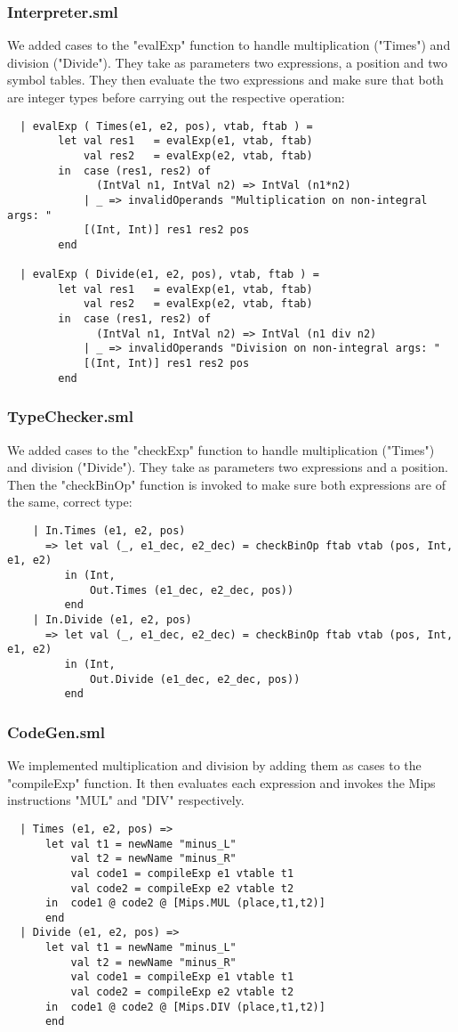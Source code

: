 \documentclass[12pt]{article}
\begin{document}
\subsubsection{Interpreter.sml}
We added cases to the "evalExp" function to handle multiplication ("Times") and division ("Divide"). They take as parameters two expressions, a position and two symbol tables. They then evaluate the two expressions and make sure that both are integer types before carrying out the respective operation: 
\begin{verbatim}
  | evalExp ( Times(e1, e2, pos), vtab, ftab ) =
        let val res1   = evalExp(e1, vtab, ftab)
            val res2   = evalExp(e2, vtab, ftab)
        in  case (res1, res2) of
              (IntVal n1, IntVal n2) => IntVal (n1*n2)
            | _ => invalidOperands "Multiplication on non-integral args: " 
            [(Int, Int)] res1 res2 pos
        end

  | evalExp ( Divide(e1, e2, pos), vtab, ftab ) = 
        let val res1   = evalExp(e1, vtab, ftab)
            val res2   = evalExp(e2, vtab, ftab)
        in  case (res1, res2) of
              (IntVal n1, IntVal n2) => IntVal (n1 div n2)
            | _ => invalidOperands "Division on non-integral args: " 
            [(Int, Int)] res1 res2 pos
        end
\end{verbatim}
\subsubsection{TypeChecker.sml}
We added cases to the "checkExp" function to handle multiplication ("Times") and division ("Divide"). They take as parameters two expressions and a position. Then the "checkBinOp" function is invoked to make sure both expressions are of the same, correct type:
\begin{verbatim}
    | In.Times (e1, e2, pos)
      => let val (_, e1_dec, e2_dec) = checkBinOp ftab vtab (pos, Int, e1, e2)
         in (Int,
             Out.Times (e1_dec, e2_dec, pos))
         end
    | In.Divide (e1, e2, pos)
      => let val (_, e1_dec, e2_dec) = checkBinOp ftab vtab (pos, Int, e1, e2)
         in (Int,
             Out.Divide (e1_dec, e2_dec, pos))
         end
\end{verbatim}
\subsubsection{CodeGen.sml}
We implemented multiplication and division by adding them as cases to the "compileExp" function. It then evaluates each expression and invokes the Mips instructions "MUL" and "DIV" respectively. 
\begin{verbatim}
  | Times (e1, e2, pos) =>
      let val t1 = newName "minus_L"
          val t2 = newName "minus_R"
          val code1 = compileExp e1 vtable t1
          val code2 = compileExp e2 vtable t2
      in  code1 @ code2 @ [Mips.MUL (place,t1,t2)]
      end
  | Divide (e1, e2, pos) =>
      let val t1 = newName "minus_L"
          val t2 = newName "minus_R"
          val code1 = compileExp e1 vtable t1
          val code2 = compileExp e2 vtable t2
      in  code1 @ code2 @ [Mips.DIV (place,t1,t2)]
      end
\end{verbatim}
\clearpage
\end{document}
